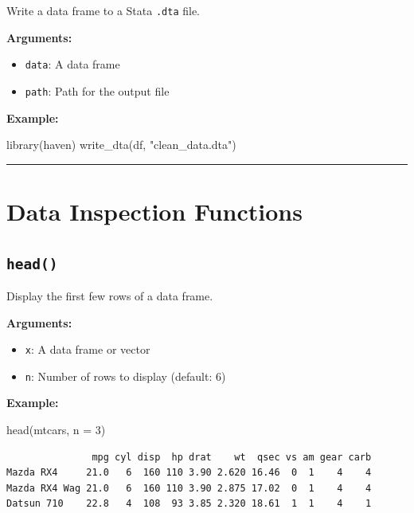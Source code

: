 \documentclass[
  letterpaper,
  DIV=11,
  numbers=noendperiod]{scrreprt}
\newenvironment{Shaded}{\begin{snugshade}}{\end{snugshade}}
\newcommand{\AttributeTok}[1]{\textcolor[rgb]{0.40,0.45,0.13}{#1}}
\newcommand{\DecValTok}[1]{\textcolor[rgb]{0.68,0.00,0.00}{#1}}
\newcommand{\FunctionTok}[1]{\textcolor[rgb]{0.28,0.35,0.67}{#1}}
\newcommand{\NormalTok}[1]{\textcolor[rgb]{0.00,0.23,0.31}{#1}}
\newcommand{\StringTok}[1]{\textcolor[rgb]{0.13,0.47,0.30}{#1}}
\providecommand{\tightlist}{%
  \setlength{\itemsep}{0pt}\setlength{\parskip}{0pt}}
\begin{document}
Write a data frame to a Stata \texttt{.dta} file.

\textbf{Arguments:}

\begin{itemize}
\tightlist
\item
  \texttt{data}: A data frame
\item
  \texttt{path}: Path for the output file
\end{itemize}

\textbf{Example:}

\begin{Shaded}
\begin{Highlighting}[]
\FunctionTok{library}\NormalTok{(haven)}
\FunctionTok{write\_dta}\NormalTok{(df, }\StringTok{"clean\_data.dta"}\NormalTok{)}
\end{Highlighting}
\end{Shaded}

\begin{center}\rule{0.5\linewidth}{0.5pt}\end{center}

\section{Data Inspection Functions}\label{data-inspection-functions}

\subsection{\texorpdfstring{\texttt{head()}}{head()}}\label{head}

Display the first few rows of a data frame.

\textbf{Arguments:}

\begin{itemize}
\tightlist
\item
  \texttt{x}: A data frame or vector
\item
  \texttt{n}: Number of rows to display (default: 6)
\end{itemize}

\textbf{Example:}

\begin{Shaded}
\begin{Highlighting}[]
\FunctionTok{head}\NormalTok{(mtcars, }\AttributeTok{n =} \DecValTok{3}\NormalTok{)}
\end{Highlighting}
\end{Shaded}

\begin{verbatim}
               mpg cyl disp  hp drat    wt  qsec vs am gear carb
Mazda RX4     21.0   6  160 110 3.90 2.620 16.46  0  1    4    4
Mazda RX4 Wag 21.0   6  160 110 3.90 2.875 17.02  0  1    4    4
Datsun 710    22.8   4  108  93 3.85 2.320 18.61  1  1    4    1
\end{verbatim}
\end{document}
